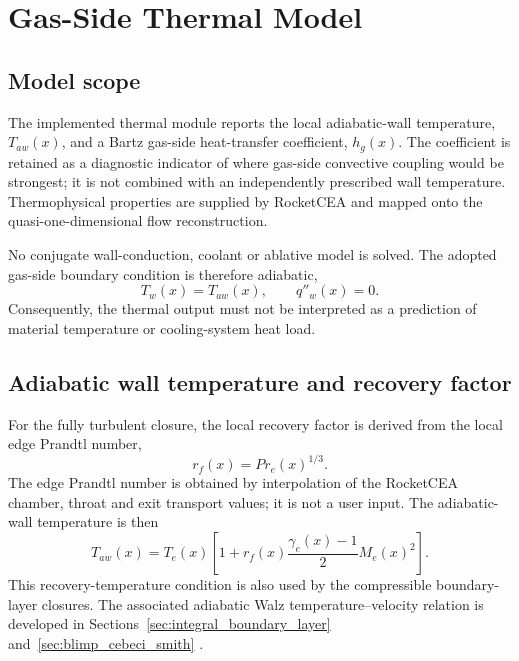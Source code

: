 \section{Gas-Side Thermal Model}
\label{sec:thermal_model}

\subsection{Model scope}

The implemented thermal module reports the local adiabatic-wall temperature,
\(T_{aw}(x)\), and a Bartz gas-side heat-transfer coefficient, \(h_g(x)\). The
coefficient is retained as a diagnostic indicator of where gas-side convective
coupling would be strongest; it is not combined with an independently prescribed
wall temperature. Thermophysical properties are supplied by RocketCEA and mapped
onto the quasi-one-dimensional flow reconstruction.

No conjugate wall-conduction, coolant or ablative model is solved. The adopted
gas-side boundary condition is therefore adiabatic,
\begin{equation}
\boxed{T_w(x)=T_{aw}(x)},
\qquad
\boxed{q''_w(x)=0}.
\label{eq:thermal_adiabatic_wall}
\end{equation}
Consequently, the thermal output must not be interpreted as a prediction of material
temperature or cooling-system heat load.

\subsection{Adiabatic wall temperature and recovery factor}

For the fully turbulent closure, the local recovery factor is derived from the local
edge Prandtl number,
\begin{equation}
r_f(x)=Pr_e(x)^{1/3}.
\label{eq:recovery_factor}
\end{equation}
The edge Prandtl number is obtained by interpolation of the RocketCEA chamber,
throat and exit transport values; it is not a user input. The adiabatic-wall
temperature is then
\begin{equation}
\boxed{
T_{aw}(x)=T_e(x)
\left[
1+r_f(x)\frac{\gamma_e(x)-1}{2}M_e(x)^2
\right]
}.
\label{eq:adiabatic_wall_temperature}
\end{equation}
This recovery-temperature condition is also used by the compressible
boundary-layer closures. The associated adiabatic Walz temperature--velocity
relation is developed in Sections~\ref{sec:integral_boundary_layer}
and~\ref{sec:blimp_cebeci_smith} \cite{Walz}.

